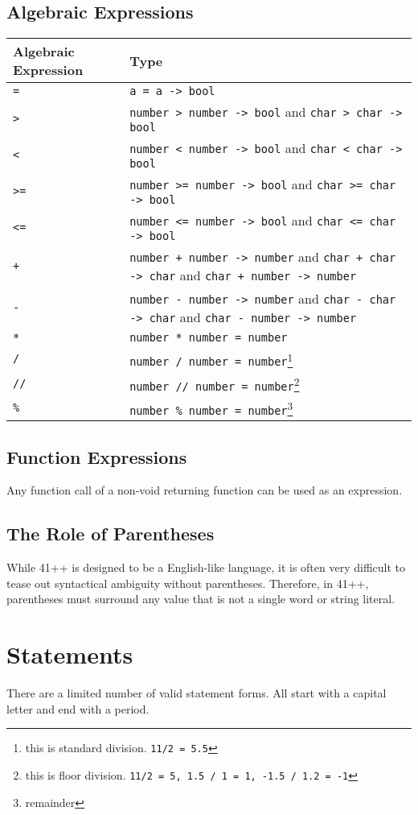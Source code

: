\documentclass{article}
\newcommand{\code}[1]{\texttt{#1}}
\begin{document}
\subsection{Algebraic Expressions}
\begin{tabular}{|l|p{10cm}|}
\hline
Algebraic Expression & Type\\
\hline
\code{=} & \code{a = a -> bool}\\
\hline
\code{>} & \code{number > number -> bool} and \code{char > char -> bool}\\
\hline
\code{<} & \code{number < number -> bool} and \code{char < char -> bool}\\
\hline
\code{>=}& \code{number >= number -> bool} and \code{char >= char -> bool}\\
\hline
\code{<=} & \code{number <= number -> bool} and \code{char <= char -> bool}\\
\hline
\code{+}& \code{number + number -> number} and \code{char + char -> char} and \code{char + number -> number}\\
\hline
\code{-} & \code{number - number -> number} and \code{char - char -> char} and \code{char - number -> number}\\
\hline
\code{*} & \code{number * number = number}\\
\hline
\code{/} & \code{number / number = number}\footnote{this is standard division. \code{11/2 = 5.5}}\\
\hline
\code{//} & \code{number // number = number}\footnote{this is floor division. \code{11/2 = 5, 1.5 / 1 = 1, -1.5 / 1.2 = -1}}\\
\hline
\code{\%} & \code{number \% number = number}\footnote{remainder}\\
\hline
\end{tabular}
\subsection{Function Expressions}
Any function call of a non-void returning function can be used as an expression.
\subsection{The Role of Parentheses}
While 41++ is designed to be a English-like language, it is often very difficult to tease out syntactical ambiguity without parentheses. Therefore, in 41++, parentheses must surround any value that is not a single word or string literal.
\section{Statements}
There are a limited number of valid statement forms. All start with a capital letter and end with a period.
\end{document}
